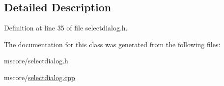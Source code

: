 \subsection{Detailed Description}


Definition at line 35 of file selectdialog.\+h.



The documentation for this class was generated from the following files\+:\begin{DoxyCompactItemize}
\item 
mscore/selectdialog.\+h\item 
mscore/\hyperlink{selectdialog_8cpp}{selectdialog.\+cpp}\end{DoxyCompactItemize}
